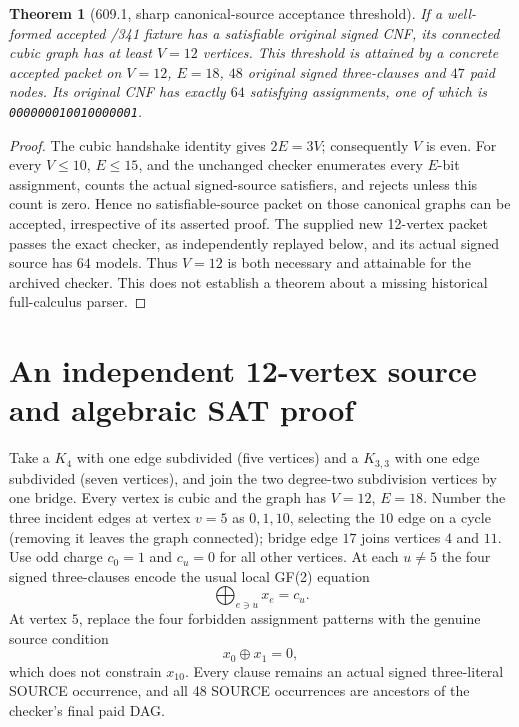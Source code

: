 \documentclass[11pt]{article}
\newtheorem{theorem}{Theorem}
\begin{document}
\begin{theorem}[609.1, sharp canonical-source acceptance threshold]
If a well-formed accepted /341 fixture has a satisfiable original signed
CNF, its connected cubic graph has at least $V=12$ vertices. This threshold
is attained by a concrete accepted packet on $V=12$, $E=18$, $48$ original
signed three-clauses and $47$ paid nodes. Its original CNF has exactly
$64$ satisfying assignments, one of which is
\texttt{000000010010000001}.
\end{theorem}
\begin{proof}
The cubic handshake identity gives $2E=3V$; consequently $V$ is even.
For every $V\le10$, $E\le15$, and the unchanged checker enumerates every
$E$-bit assignment, counts the actual signed-source satisfiers, and rejects
unless this count is zero. Hence no satisfiable-source packet on those
canonical graphs can be accepted, irrespective of its asserted proof.
The supplied new 12-vertex packet passes the exact checker, as independently
replayed below, and its actual signed source has $64$ models. Thus
$V=12$ is both necessary and attainable for the archived checker. This
does not establish a theorem about a missing historical full-calculus parser.
\end{proof}

\section*{An independent 12-vertex source and algebraic SAT proof}
Take a $K_4$ with one edge subdivided (five vertices) and a $K_{3,3}$
with one edge subdivided (seven vertices), and join the two degree-two
subdivision vertices by one bridge. Every vertex is cubic and the graph
has $V=12$, $E=18$. Number the three incident edges at vertex $v=5$ as
$0,1,10$, selecting the $10$ edge on a cycle (removing it leaves the
graph connected); bridge edge $17$ joins vertices $4$ and $11$.
Use odd charge $c_0=1$ and $c_u=0$ for all other vertices.
At each $u\ne5$ the four signed three-clauses encode the usual
local GF(2) equation
\[
 \bigoplus_{e\ni u}x_e=c_u.
\]
At vertex $5$, replace the four forbidden assignment patterns with
the genuine source condition
\[
 x_0\oplus x_1=0,
\]
which does not constrain $x_{10}$. Every clause remains an actual
signed three-literal SOURCE occurrence, and all 48 SOURCE occurrences
are ancestors of the checker's final paid DAG.
\end{document}

